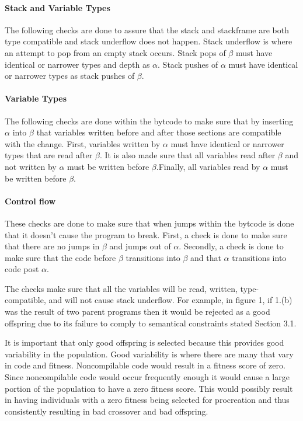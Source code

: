 \documentclass{sig-alternate}
\begin{document}
\paragraph{Stack and Variable Types}
The following checks are done to assure that the stack and stackframe are both type compatible and stack underflow does not happen. Stack underflow is where an attempt to pop from an empty stack occurs. Stack pops of $\beta$ must have identical or narrower types and depth as $\alpha$. Stack pushes of $\alpha$ must have identical or narrower types as stack pushes of $\beta$.

\paragraph{Variable Types}
The following checks are done within the bytcode to make sure that by inserting $\alpha$ into $\beta$ that variables written before and after those sections are compatible with the change. 
First, variables written by $\alpha$ must have identical or narrower types that are read after $\beta$. It is also made sure that all variables read after $\beta$ and not written by $\alpha$ must be written before $\beta$.Finally, all variables read by $\alpha$ must be written before $\beta$.

\paragraph{Control flow}
These checks are done to make sure that when jumps within the bytcode is done that it doesn't cause the program to break. First, a check is done to make sure that there are no jumps in $\beta$ and jumps out of $\alpha$. Secondly, a check is done to make sure that the code before $\beta$ transitions into $\beta$ and that $\alpha$ transitions into code post $\alpha$.  


The checks make sure that all the variables will be read, written, type-compatible, and will not cause stack underflow\cite{VIII:2011}. For example, in figure 1, if 1.(b) was the result of two parent programs then it would be rejected as a good offspring due to its failure to comply to semantical constraints stated Section 3.1.\par
It is important that only good offspring is selected because this provides good variability in the population. Good variability is where there are many that vary in code and fitness. Noncompilable code would result in a fitness score of zero. Since noncompilable code would occur frequently enough it would cause a large portion of the population to have a zero fitness score. This would possibly result in having individuals with a zero fitness being selected for procreation and thus consistently resulting in bad crossover and bad offspring.
\end{document}
